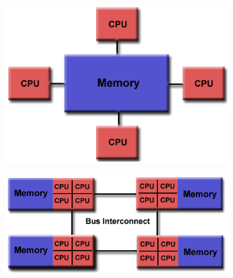 \begin{description}
\begin{description}
\begin{itemize}
\begin{figure}[b]
\begin{subfigure}[b]{0.5\textwidth}
				\includegraphics[width=0.92\textwidth]{./images/parallel_programming/shared_mem}
				\caption[]{}%
			\end{subfigure}%
			\begin{subfigure}[b]{0.5\textwidth}
				\centering
				\includegraphics[width=0.92\textwidth]{./images/parallel_programming/numa}
				\caption[]{}%
			\end{subfigure}%
		\label{fig:UMA_NUMA}
		\end{figure}
		


\end{itemize}
\end{description}
\end{description}
